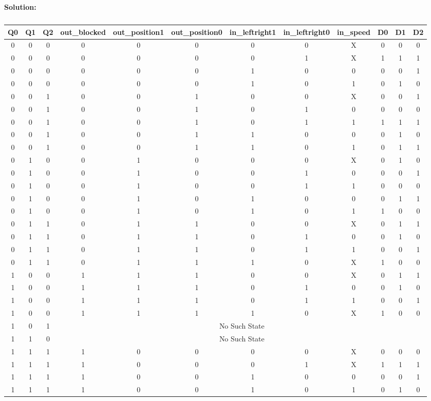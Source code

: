 \textbf{Solution:}

\begin{table}[H]
    \centering
    \begin{tabular}{|c|c|c|c|c|c|c|c|c|c|c|c|}
        \hline
        Q0& Q1& Q2& out\_blocked & out\_position1&out\_position0& in\_leftright1 &in\_leftright0& in\_speed& D0& D1&D2\\
        \hline
        0 & 0 & 0 & 0  & 0  &0& 0&0& X& 0& 0&0\\ \hline 
 0 & 0 & 0 & 0  & 0  &0& 0& 1& X& 1& 1&1\\ \hline 
 0 & 0 & 0 & 0  & 0  &0& 1& 0& 0& 0& 0&1\\ \hline 
 0 & 0 & 0 & 0  & 0  &0& 1& 0& 1& 0& 1&0\\ \hline 
        0 & 0 & 1 & 0  & 0  &1& 0&0& X& 0& 0&1\\ \hline 
 0 & 0 & 1 &  0  & 0  &1& 0& 1& 0& 0& 0&0\\ \hline 
 0 & 0 & 1 &  0  & 0  &1& 0& 1& 1& 1& 1&1\\ \hline 
 0 & 0 & 1 &  0  & 0  &1& 1& 0& 0& 0& 1&0\\ \hline 
 0 & 0 & 1 &  0  & 0  &1& 1& 0& 1& 0& 1&1\\ \hline 
        0 & 1 & 0 & 0  & 1  &0& 0&0& X& 0& 1&0\\ \hline 
 0 & 1 & 0 & 0  & 1  & 0& 0& 1& 0& 0& 0&1\\ \hline 
 0 & 1 & 0 & 0  & 1  & 0& 0& 1& 1& 0& 0&0\\ \hline 
 0 & 1 & 0 & 0  & 1  & 0& 1& 0& 0& 0& 1&1\\ \hline 
 0 & 1 & 0 & 0  & 1  & 0& 1& 0& 1& 1& 0&0\\ \hline 
        0 & 1 & 1 & 0 & 1&1& 0&0& X& 0& 1&1\\ \hline 
 0 & 1 & 1 & 0 & 1& 1& 0& 1& 0& 0& 1&0\\ \hline 
 0 & 1 & 1 & 0 & 1& 1& 0& 1& 1& 0& 0&1\\ \hline 
 0 & 1 & 1 & 0 & 1& 1& 1& 0& X& 1& 0&0\\ \hline 
        1 & 0 & 0 & 1 & 1&1& 0&0& X& 0& 1&1\\ \hline 
 1 & 0 & 0 & 1 & 1& 1& 0& 1& 0& 0& 1&0\\ \hline 
 1 & 0 & 0 & 1 & 1& 1& 0& 1& 1& 0& 0&1\\ \hline 
 1 & 0 & 0 & 1 & 1& 1& 1& 0& X& 1& 0&0\\ \hline 
        1& 0& 1&  \multicolumn{9}{|c|}{No Such State}\\ \hline 
        1& 1& 0&  \multicolumn{9}{|c|}{No Such State}\\ \hline 
        1 & 1 & 1 & 1 & 0&0& 0&0& X& 0& 0&0\\ \hline
 1 & 1 & 1 & 1 & 0& 0& 0& 1& X& 1& 1&1\\ \hline 
 1 & 1 & 1 & 1 & 0& 0& 1& 0& 0& 0& 0&1\\ \hline 
 1 & 1 & 1 & 1 & 0& 0& 1& 0& 1& 0& 1&0\\ \hline
    \end{tabular}
    \caption{}
    \label{tab:truth_table}
\end{table}

